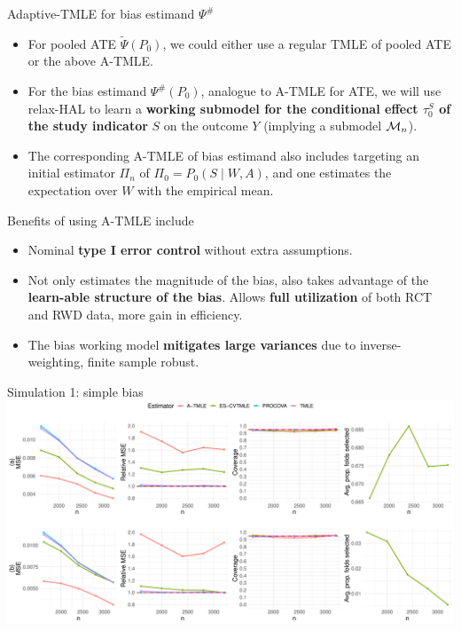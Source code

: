 \documentclass[t]{beamer}
\begin{document}
\begin{frame}{Adaptive-TMLE for bias estimand $\Psi^{\#}$}
\begin{itemize}
\item For pooled ATE $\tilde{\Psi}(P_0)$, we  could either use a regular TMLE of pooled ATE or the above A-TMLE.
\item For the bias estimand $\Psi^{\#}(P_0)$, analogue to A-TMLE for ATE,  we will use relax-HAL to learn a \textbf{working submodel for the conditional effect $\tau^S_0$ of the study indicator} $S$ on the outcome $Y$ (implying a submodel ${\cal M}_n$). 
\item The corresponding A-TMLE of bias estimand also includes targeting an initial estimator $\Pi_n$ of $\Pi_0=P_0(S\mid W,A)$, and one estimates the expectation over $W$ with the empirical mean. 
\end{itemize}
\end{frame}

\begin{frame}{Benefits of using A-TMLE include}
\begin{itemize}
\item Nominal \textbf{type I error control} without extra assumptions.
\item Not only estimates the magnitude of the bias, also takes advantage of the \textbf{learn-able structure of the bias}. Allows \textbf{full utilization} of both RCT and RWD data, more gain in efficiency.
\item The bias working model \textbf{mitigates large variances} due to inverse-weighting, finite sample robust.
\end{itemize}
\end{frame}

\begin{frame}{Simulation 1: simple bias}
\centering
\vspace{1cm}
\includegraphics[width=1\textwidth,height=0.65\textheight]{figures/simple.pdf}
\end{frame}
\end{document}
